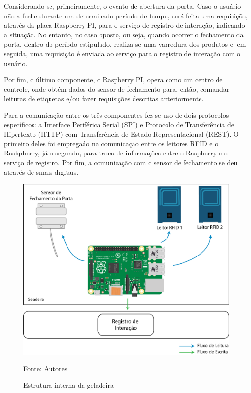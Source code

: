 Considerando-se, primeiramente, o evento de abertura da porta. Caso o usuário não a feche durante um determinado período de tempo, será feita uma requisição, através da placa Raspberry PI, para o serviço de registro de interação, indicando a situação. No entanto, no caso oposto, ou seja, quando ocorrer o fechamento da porta, dentro do período estipulado, realiza-se uma varredura dos produtos e, em seguida, uma requisição é enviada ao serviço para o registro de interação com o usuário.

Por fim, o último componente, o Raspberry PI, opera como um centro de controle, onde obtém dados do sensor de fechamento para, então, comandar leituras de etiquetas e/ou fazer requisições descritas anteriormente.

Para a comunicação entre os três componentes fez-se uso de dois protocolos específicos: a Interface Periférica Serial (SPI) e Protocolo de Transferência de Hipertexto (HTTP) com Transferência de Estado Representacional (REST). O primeiro deles foi empregado na comunicação entre os leitores RFID e o Rasbpberry, já o segundo, para troca de informações entre o Raspberry e o serviço de registro. Por fim, a comunicação com o sensor de fechamento se deu através de sinais digitais.




\begin{figure}[htb]
    \caption{Estrutura interna da geladeira}
    \label{fig:cap4_estr_geladeira}
    \includegraphics[width=\textwidth]{figuras/c4_modelo-logico-hardware.png}
    
    Fonte: Autores
\end{figure}

